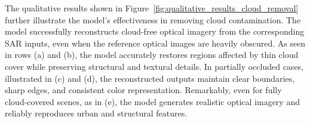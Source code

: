 The qualitative results shown in Figure~\ref{fig:qualitative_results_cloud_removal} further illustrate the model’s effectiveness in removing cloud contamination. The model successfully reconstructs cloud-free optical imagery from the corresponding SAR inputs, even when the reference optical images are heavily obscured. As seen in rows (a) and (b), the model accurately restores regions affected by thin cloud cover while preserving structural and textural details. In partially occluded cases, illustrated in (c) and (d), the reconstructed outputs maintain clear boundaries, sharp edges, and consistent color representation. Remarkably, even for fully cloud-covered scenes, as in (e), the model generates realistic optical imagery and reliably reproduces urban and structural features.

\begin{figure}[!htbp]
    \centering
    \setlength{\tabcolsep}{2pt} %
    \renewcommand{\arraystretch}{1.0} %


\end{figure}
